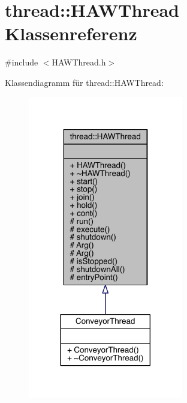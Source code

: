 \hypertarget{classthread_1_1_h_a_w_thread}{}\section{thread\+:\+:H\+A\+W\+Thread Klassenreferenz}
\label{classthread_1_1_h_a_w_thread}


{\ttfamily \#include $<$H\+A\+W\+Thread.\+h$>$}



Klassendiagramm für thread\+:\+:H\+A\+W\+Thread\+:
\nopagebreak
\begin{figure}[H]
\begin{center}
\leavevmode
\includegraphics[width=192pt]{classthread_1_1_h_a_w_thread__inherit__graph}
\end{center}
\end{figure}


